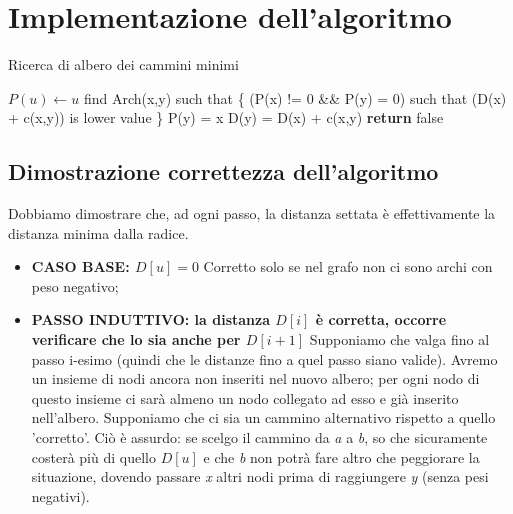 \section{Implementazione dell'algoritmo}
\begin{algorithm}
    \caption{Ricerca di albero dei cammini minimi}\label{alg:ACM}
    \begin{algorithmic}[1]
            \State $P(u) \gets u$  
                \State find Arch(x,y) such that \{
                \State (P(x) != 0 && P(y) = 0) such that 
                \State (D(x) + c(x,y)) is lower value 
                \State \}
                \State P(y) = x
                \State D(y) = D(x) + c(x,y)
            \EndFor
            \State \textbf{return} false\Comment{}
        \EndFunction
    \end{algorithmic}
\end{algorithm}

\subsection{Dimostrazione correttezza dell'algoritmo}
Dobbiamo dimostrare che, ad ogni passo, la distanza settata è effettivamente la distanza minima dalla radice.
\begin{itemize}
    \item \textbf{CASO BASE: $ D[u] = 0 $}
        Corretto solo se nel grafo non ci sono archi con peso negativo;
    \item \textbf{PASSO INDUTTIVO: la distanza $D[i]$ è corretta, occorre verificare che lo sia anche per $D[i+1]$}
        Supponiamo che valga fino al passo i-esimo (quindi che le distanze fino a quel passo siano valide). Avremo un insieme di nodi ancora non inseriti nel nuovo albero; per ogni nodo di questo insieme ci sarà almeno un nodo collegato ad esso e già inserito nell'albero. Supponiamo che ci sia un cammino alternativo rispetto a quello 'corretto'. Ciò è assurdo: se scelgo il cammino da \textit{a} a \textit{b}, so che sicuramente costerà più di quello $D[u]$ e che \textit{b} non potrà fare altro che peggiorare la situazione, dovendo passare \textit{x} altri nodi prima di raggiungere \textit{y} (senza pesi negativi).
\end{itemize}


